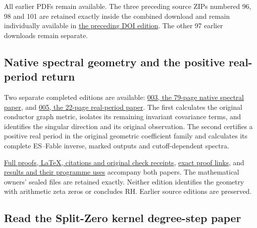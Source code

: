 \documentclass[
]{article}
\begin{document}
All earlier PDFs remain available. The three preceding source ZIPs
numbered 96, 98 and 101 are retained exactly inside the combined
download and remain individually available in
\href{https://zenodo.org/records/22865355}{the preceding DOI edition}.
The other 97 earlier downloads remain separate.

\subsection{Native spectral geometry and the positive real-period
return}\label{native-spectral-geometry-and-the-positive-real-period-return}

Two separate completed editions are available:
\href{https://github.com/KokunoYumeto/zeta-function-research-reader/blob/main/workbenches/splitzero-tandem/continuations/20260921-native-spectral-real-pair/003/COMPLETE_NATIVE_SPECTRAL_READER.pdf}{003,
the 79-page native spectral paper}, and
\href{https://github.com/KokunoYumeto/zeta-function-research-reader/blob/main/workbenches/splitzero-tandem/continuations/20260921-native-spectral-real-pair/005/REAL_PAIR_005.pdf}{005,
the 22-page real-period paper}. The first calculates the original
conductor graph metric, isolates its remaining invariant covariance
terms, and identifies the singular direction and its original
observation. The second certifies a positive real period in the original
geometric coefficient family and calculates its complete ES--Fable
inverse, marked outputs and cutoff-dependent spectra.

\href{https://github.com/KokunoYumeto/zeta-function-research-reader/blob/main/workbenches/splitzero-tandem/continuations/20260921-native-spectral-real-pair/README.md}{Full
proofs, LaTeX, citations and original check receipts},
\href{https://github.com/KokunoYumeto/zeta-function-research-reader/blob/main/workbenches/splitzero-tandem/continuations/20260921-native-spectral-real-pair/PROOF_LINKS.json}{exact
proof links}, and
\href{https://github.com/KokunoYumeto/zeta-function-research-reader/blob/main/workbenches/splitzero-tandem/continuations/20260921-native-spectral-real-pair/RESULT_INDEX.json}{results
and their programme uses} accompany both papers. The mathematical
owners' sealed files are retained exactly. Neither edition identifies
the geometry with arithmetic zeta zeros or concludes RH. Earlier source
editions are preserved.

\subsection{Read the Split-Zero kernel degree-step
paper}\label{read-the-split-zero-kernel-degree-step-paper}
\end{document}
